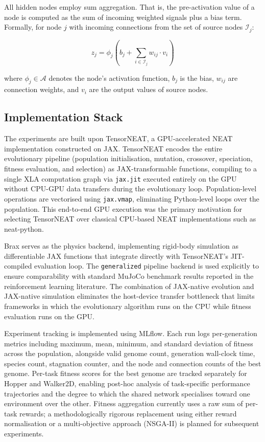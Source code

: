 \documentclass[12pt]{article}
\begin{document}
All hidden nodes employ sum aggregation. That is, the pre-activation value of a node is computed as the sum of incoming weighted signals plus a bias term. Formally, for node $j$ with incoming connections from the set of source nodes $\mathcal{I}_j$:

$$z_j = \phi_j\left(b_j + \sum_{i \in \mathcal{I}_j} w_{ij} \cdot v_i\right)$$

where $\phi_j \in \mathcal{A}$ denotes the node's activation function, $b_j$ is the bias, $w_{ij}$ are connection weights, and $v_i$ are the output values of source nodes.

\subsection{Implementation Stack}

The experiments are built upon TensorNEAT, a GPU-accelerated NEAT implementation constructed on JAX. TensorNEAT encodes the entire evolutionary pipeline (population initialisation, mutation, crossover, speciation, fitness evaluation, and selection) as JAX-transformable functions, compiling to a single XLA computation graph via \texttt{jax.jit} executed entirely on the GPU without CPU-GPU data transfers during the evolutionary loop. Population-level operations are vectorised using \texttt{jax.vmap}, eliminating Python-level loops over the population. This end-to-end GPU execution was the primary motivation for selecting TensorNEAT over classical CPU-based NEAT implementations such as neat-python.

Brax serves as the physics backend, implementing rigid-body simulation as differentiable JAX functions that integrate directly with TensorNEAT's JIT-compiled evaluation loop. The \texttt{generalized} pipeline backend is used explicitly to ensure comparability with standard MuJoCo benchmark results reported in the reinforcement learning literature. The combination of JAX-native evolution and JAX-native simulation eliminates the host-device transfer bottleneck that limits frameworks in which the evolutionary algorithm runs on the CPU while fitness evaluation runs on the GPU.

Experiment tracking is implemented using MLflow. Each run logs per-generation metrics including maximum, mean, minimum, and standard deviation of fitness across the population, alongside valid genome count, generation wall-clock time, species count, stagnation counter, and the node and connection counts of the best genome. Per-task fitness scores for the best genome are tracked separately for Hopper and Walker2D, enabling post-hoc analysis of task-specific performance trajectories and the degree to which the shared network specialises toward one environment over the other. Fitness aggregation currently uses a raw sum of per-task rewards; a methodologically rigorous replacement using either reward normalisation or a multi-objective approach (NSGA-II) is planned for subsequent experiments.
\end{document}
